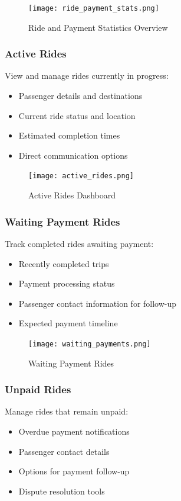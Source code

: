 \documentclass[12pt]{article}
\begin{document}
\begin{figure}[H]
  \centering
  \texttt{[image: ride\_payment\_stats.png]}
  \caption{Ride and Payment Statistics Overview}
\end{figure}

\subsubsection{Active Rides}
View and manage rides currently in progress:
\begin{itemize}
    \item Passenger details and destinations
    \item Current ride status and location
    \item Estimated completion times
    \item Direct communication options
\end{itemize}

\begin{figure}[H]
  \centering
  \texttt{[image: active\_rides.png]}
  \caption{Active Rides Dashboard}
\end{figure}

\subsubsection{Waiting Payment Rides}
Track completed rides awaiting payment:
\begin{itemize}
    \item Recently completed trips
    \item Payment processing status
    \item Passenger contact information for follow-up
    \item Expected payment timeline
\end{itemize}

\begin{figure}[H]
  \centering
  \texttt{[image: waiting\_payments.png]}
  \caption{Waiting Payment Rides}
\end{figure}

\subsubsection{Unpaid Rides}
Manage rides that remain unpaid:
\begin{itemize}
    \item Overdue payment notifications
    \item Passenger contact details
    \item Options for payment follow-up
    \item Dispute resolution tools
\end{itemize}
\end{document}
